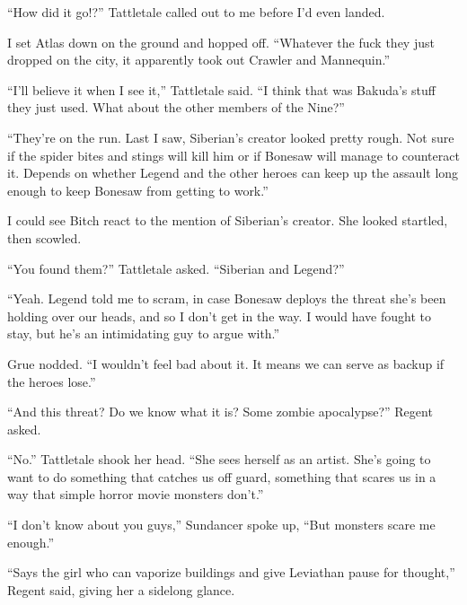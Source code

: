 





``How did it go!?''  Tattletale called out to me before I'd even landed.



I set Atlas down on the ground and hopped off.  ``Whatever the fuck they just dropped on the city, it apparently took out Crawler and Mannequin.''



``I'll believe it when I see it,'' Tattletale said.  ``I think that was Bakuda's stuff they just used.  What about the other members of the Nine?''



``They're on the run.  Last I saw, Siberian's creator looked pretty rough.  Not sure if the spider bites and stings will kill him or if Bonesaw will manage to counteract it.  Depends on whether Legend and the other heroes can keep up the assault long enough to keep Bonesaw from getting to work.''



I could see Bitch react to the mention of Siberian's creator.  She looked startled, then scowled.



``You found them?''  Tattletale asked.  ``Siberian and Legend?''



``Yeah.  Legend told me to scram, in case Bonesaw deploys the threat she's been holding over our heads, and so I don't get in the way.  I would have fought to stay, but he's an intimidating guy to argue with.''



Grue nodded.  ``I wouldn't feel bad about it.  It means we can serve as backup if the heroes lose.''



``And this threat?  Do we know what it is?  Some zombie apocalypse?''  Regent asked.



``No.'' Tattletale shook her head.  ``She sees herself as an artist.  She's going to want to do something that catches us off guard, something that scares us in a way that simple horror movie monsters don't.''



``I don't know about you guys,'' Sundancer spoke up, ``But monsters scare me enough.''



``Says the girl who can vaporize buildings and give Leviathan pause for thought,'' Regent said, giving her a sidelong glance.



